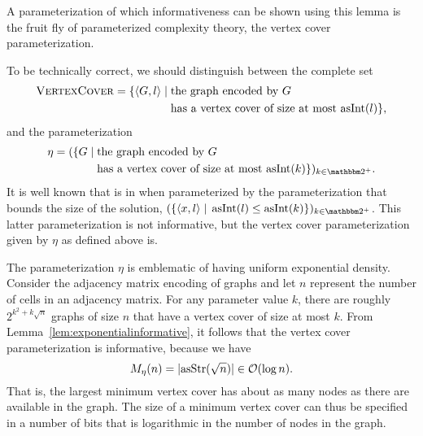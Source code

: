 A parameterization of which informativeness can be shown using this lemma is the fruit fly of parameterized complexity theory, the vertex cover parameterization.
\begin{example}
  To be technically correct, we should distinguish between the  complete \parencite{garey1979computers} set
  \begin{align*}
    \defkeyat{VertexCover@\pr{VertexCover}}{\pr{VertexCover}} \deq \{\pair{G}{l} \st &\text{the graph encoded by $G$} \\
    	&\text{has a vertex cover of size at most $\asNat(l)$}\},
  \end{align*}
  and the parameterization
  \begin{align*}
    \eta \deq (\{G \st &\text{the graph encoded by $G$} \\
    	&\text{has a vertex cover of size at most $\asNat(k)$}\})_{k \in \binary^+}.
  \end{align*}
  It is well known that  is in  when parameterized by the parameterization that bounds the size of the solution, $(\{\pair{x}{l} \st \asNat(l) \le \asNat(k)\})_{k \in \binary^+}$.
  This latter parameterization is not informative, but the vertex cover parameterization given by $\eta$ as defined above is.

  The parameterization $\eta$ is emblematic of having uniform exponential density.
  Consider the adjacency matrix encoding of graphs and let $n$ represent the number of cells in an adjacency matrix.
  For any parameter value $k$, there are roughly $2^{k^2 + k\sqrt{n}}$ graphs of size $n$ that have a vertex cover of size at most $k$.
  From Lemma~\ref{lem:exponentialinformative}, it follows that the vertex cover parameterization is informative, because we have
  \begin{equation*}
    M_\eta(n) = {\lvert\operatorname{asStr}(\sqrt{n})\rvert} \in \operatorname{\mathcal{O}}(\log n).
  \end{equation*}
  That is, the largest minimum vertex cover has about as many nodes as there are available in the graph.
  The size of a minimum vertex cover can thus be specified in a number of bits that is logarithmic in the number of nodes in the graph.
\end{example}

